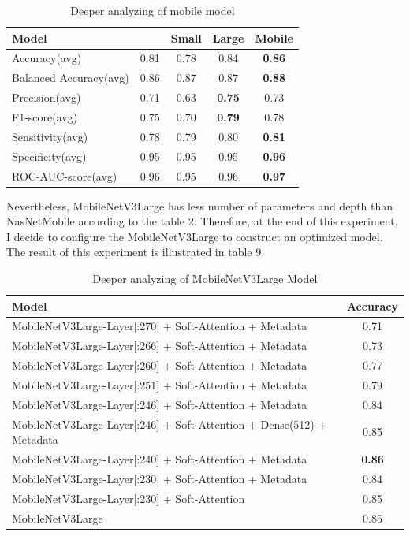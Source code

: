 \begin{table}[ht]
	\centering	
	\begin{tabular}{|l | c | c | c | c|} 
		\hline
		Model & \cite{04381} & \cite{02244}Small & \cite{02244}Large & \cite{07012}Mobile\\
		\hline
		Accuracy(avg) & 0.81 & 0.78 & 0.84 & \textbf{0.86}\\
		\hline
		Balanced Accuracy(avg) & 0.86 & 0.87 & 0.87 & \textbf{0.88}\\ 
		\hline
		Precision(avg) & 0.71 & 0.63 & \textbf{0.75} & 0.73\\
		\hline
		F1-score(avg) & 0.75 & 0.70 & \textbf{0.79} & 0.78\\
		\hline
		Sensitivity(avg) & 0.78 & 0.79 & 0.80 & \textbf{0.81}\\ 
		\hline
		Specificity(avg) & 0.95 & 0.95 & 0.95 & \textbf{0.96}\\
		\hline
		ROC-AUC-score(avg) & 0.96 & 0.95 & 0.96 & \textbf{0.97}\\
		\hline
	\end{tabular}
	\caption{Deeper analyzing of mobile model}
	\label{table:8}
\end{table}
\FloatBarrier
Nevertheless, MobileNetV3Large has less number of parameters and depth than NasNetMobile according to the table 2. Therefore, at the end of this experiment, I decide to configure the MobileNetV3Large to construct an optimized model. The result of this experiment is illustrated in table 9.
\FloatBarrier
\begin{table}[ht]
	\centering
	\begin{tabular}{|l | c |}
		\hline
		Model & Accuracy\\
		\hline
		MobileNetV3Large-Layer[:270] + Soft-Attention + Metadata & 0.71 \\
		\hline
		MobileNetV3Large-Layer[:266] + Soft-Attention + Metadata  & 0.73 \\
		\hline
		MobileNetV3Large-Layer[:260] + Soft-Attention + Metadata  & 0.77 \\
		\hline
		MobileNetV3Large-Layer[:251] + Soft-Attention + Metadata  & 0.79 \\
		\hline
		MobileNetV3Large-Layer[:246] + Soft-Attention + Metadata  & 0.84 \\
		\hline
		MobileNetV3Large-Layer[:246] + Soft-Attention + Dense(512) + Metadata & 0.85 \\
		\hline
		MobileNetV3Large-Layer[:240] + Soft-Attention + Metadata  & \textbf{0.86}\\
		\hline
		MobileNetV3Large-Layer[:230] + Soft-Attention + Metadata  & 0.84 \\
		\hline
		MobileNetV3Large-Layer[:230] + Soft-Attention & 0.85 \\ 
		\hline
		MobileNetV3Large & 0.85 \\ 
		\hline
	\end{tabular}
	\caption{Deeper analyzing of MobileNetV3Large Model}
	\label{table:9}
\end{table}
